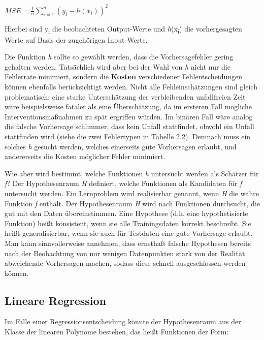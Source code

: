 $MSE=\displaystyle \frac{1}{n} \displaystyle \sum_{i=1}^{n} (y_i - h(x_i))^2$

\vspace{0.3cm}

Hierbei sind y\textsubscript{i} die beobachteten Output-Werte und
\emph{h}(x\textsubscript{i}) die vorhergesagten Werte auf Basis der zugehörigen
Input-Werte.

Die Funktion \emph{h} sollte so gewählt werden, dass die Vorhersagefehler
gering gehalten werden. Tatsächlich wird aber bei der Wahl von \emph{h} nicht nur die
Fehlerrate minimiert, sondern die \textbf{Kosten} verschiedener Fehlentscheidungen
können ebenfalls berücksichtigt werden. Nicht alle Fehleinschätzungen sind gleich
problematisch: eine starke Unterschätzung der verbleibenden unfallfreien Zeit wäre
beispielsweise fataler als eine Überschätzung, da im ersteren Fall mögliche
Interventionsmaßnahmen zu spät ergriffen würden. Im binären Fall wäre analog die
falsche Vorhersage schlimmer, dass kein Unfall stattfindet, obwohl ein Unfall
stattfinden wird (siehe die zwei Fehlertypen in Tabelle 2.2). Demnach muss ein
solches \emph{h} gesucht werden, welches einerseits gute Vorhersagen erlaubt, und
andererseits die Kosten möglicher Fehler minimiert.

Wie aber wird bestimmt, welche Funktionen \emph{h} untersucht werden als Schätzer für
\emph{f}? Der Hypothesenraum \emph{H} definiert, welche Funktionen als Kandidaten für
\emph{f} untersucht werden. Ein Lernproblem wird realisierbar genannt, wenn \emph{H}
die wahre Funktion \emph{f} enthält. Der Hypothesenraum \emph{H} wird nach Funktionen
durchsucht, die gut mit den Daten übereinstimmen. Eine Hypothese (d.h. eine
hypothetisierte Funktion) heißt konsistent, wenn sie alle Trainingsdaten korrekt
beschreibt. Sie heißt generalisierbar, wenn sie auch für Testdaten eine gute
Vorhersage erlaubt. Man kann sinnvollerweise annehmen, dass ernsthaft falsche
Hypothesen bereits nach der Beobachtung von nur wenigen Datenpunkten stark von der
Realität abweichende Vorhersagen machen, sodass diese schnell ausgeschlossen werden
können.

\subsection{Lineare Regression}

Im Falle einer Regressionsentscheidung könnte der Hypothesenraum aus der Klasse der
linearen Polynome bestehen, das heißt Funktionen der Form:

